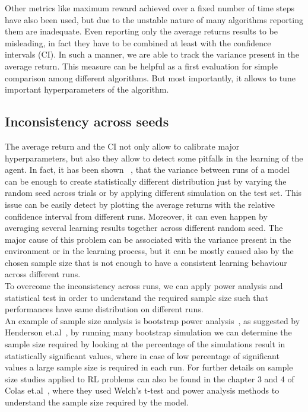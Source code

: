 \documentclass{article}
\begin{document}
Other metrics like maximum reward achieved over a fixed number of time steps have also been used, but  due to the unstable nature of many algorithms reporting them are inadequate. Even reporting only the average returns results to be misleading, in fact they have to be combined at least with the confidence intervals (CI). In such a manner, we are able to track the variance present in the average return. This measure can be helpful as a first evaluation for simple comparison among different algorithms. But most importantly, it allows to tune important hyperparameters of the algorithm.
\subsection{Inconsistency across seeds}
The average return and the CI not only allow to calibrate major hyperparameters, but also they allow to detect some pitfalls in the learning of the agent. In fact, it has been shown ~\cite{DRL01}, that the variance between runs of a model can be enough to create statistically different distribution just by varying the random seed across trials or by applying different simulation on the test set. This issue can be easily detect by plotting the average returns with the relative confidence interval from different runs.
Moreover, it can even happen by averaging several learning results together across different random seed.
The major cause of this problem can be associated with the variance present in the environment or in the learning process, but it can be mostly caused also by the chosen sample size that is not enough to have a consistent learning behaviour across different runs.\\
To overcome the inconsistency across runs, we can apply power analysis and statistical test in order to understand the required sample size such that performances have same distribution on different runs.\\
An example of sample size analysis is bootstrap power analysis~\cite{pwranaly2}, as suggested by Henderson et.al~\cite{DRL01}, by running many bootstrap simulation we can determine the sample size required by looking at the percentage of the simulations result in statistically significant values, where in case of low percentage of significant values a large sample size is required in each run. For further details on sample size studies applied to RL problems can also be found in the chapter 3 and 4 of Colas et.al~\cite{PowerAnalysis}, where they used Welch's t-test and power analysis methods to understand the sample size required by the model.
\end{document}
